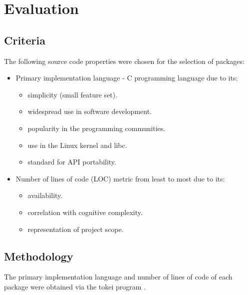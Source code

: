 \section{Evaluation}\label{Evaluation}

\subsection{Criteria}

The following source code properties were chosen for the selection of packages:

\begin{itemize}
    \item Primary implementation language - C programming language due to its:
    \begin{itemize}
        \item simplicity (small feature set).
        \item widespread use in software development.
        \item popularity in the programming communities.
        \item use in the Linux kernel and libc.
        \item standard for API portability.
    \end{itemize}
    \item Number of lines of code (LOC) metric from least to most due to its:
    \begin{itemize}
        \item availability.
        \item correlation with cognitive complexity.
        \item representation of project scope.
    \end{itemize}
\end{itemize}

\subsection{Methodology}

The primary implementation language and number of lines of code of each package were obtained via the tokei program \cite{tokei}.
